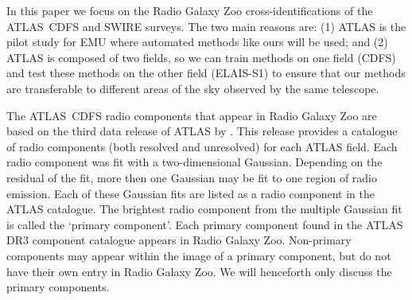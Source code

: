 \documentclass[fleqn,usenatbib,usedcolumn]{mnras}
\begin{document}

    In this paper we focus on the Radio Galaxy Zoo cross-identifications of
    the ATLAS~CDFS and SWIRE surveys. The two main reasons are: (1) ATLAS is
    the pilot study for EMU where automated methods like ours will be used;
    and (2) ATLAS is composed of two fields, so we can train methods on one
    field (CDFS) and test these methods on the other field (ELAIS-S1) to
    ensure that our methods are transferable to different areas of the sky
    observed by the same telescope.

    The ATLAS~CDFS radio components that appear in Radio Galaxy Zoo are based
    on the third data release of ATLAS by \citet{franzen15}. This release
    provides a catalogue of radio components (both resolved and unresolved)
    for each ATLAS field. Each radio component was fit with a two-dimensional
    Gaussian. Depending on the residual of the fit, more then one Gaussian may
    be fit to one region of radio emission.  Each of these Gaussian fits are
    listed as a radio component in the ATLAS catalogue. The brightest radio
    component from the multiple Gaussian fit is called the `primary
    component'. Each primary component found in the ATLAS DR3 component
    catalogue appears in Radio Galaxy Zoo. Non-primary components may appear
    within the image of a primary component, but do not have their own entry
    in Radio Galaxy Zoo. We will henceforth only discuss the primary
    components.
\end{document}
